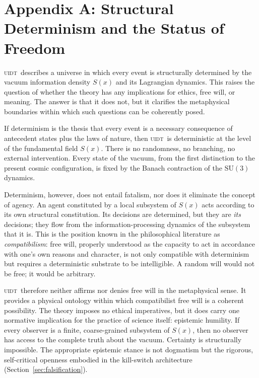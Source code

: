 \documentclass[12pt,a4paper,twoside]{article}
\theoremstyle{plain}
\theoremstyle{definition}
\theoremstyle{remark}
\newcommand{\UIDT}{\textsc{uidt}}
\newcommand{\Sx}{S(x)}
\begin{document}
\newpage

\section*{Appendix A: Structural Determinism and the Status of Freedom}
\label{app:normative}

\UIDT\ describes a universe in which every event is structurally determined by
the vacuum information density $\Sx$ and its Lagrangian dynamics. This raises
the question of whether the theory has any implications for ethics, free will,
or meaning. The answer is that it does not, but it clarifies the metaphysical
boundaries within which such questions can be coherently posed.

If determinism is the thesis that every event is a necessary consequence of
antecedent states plus the laws of nature, then \UIDT\ is deterministic at the
level of the fundamental field $\Sx$. There is no randomness, no branching,
no external intervention. Every state of the vacuum, from the first distinction
to the present cosmic configuration, is fixed by the Banach contraction of the
$\mathrm{SU}(3)$ dynamics.

Determinism, however, does not entail fatalism, nor does it eliminate the
concept of agency. An agent constituted by a local subsystem of $S(x)$ acts
according to its own structural constitution. Its decisions are determined,
but they are \emph{its} decisions; they flow from the information-processing
dynamics of the subsystem that it is. This is the position known in the
philosophical literature as \emph{compatibilism}: free will, properly understood
as the capacity to act in accordance with one's own reasons and character, is
not only compatible with determinism but requires a deterministic substrate
to be intelligible. A random will would not be free; it would be arbitrary.

\UIDT\ therefore neither affirms nor denies free will in the metaphysical
sense. It provides a physical ontology within which compatibilist free will is
a coherent possibility. The theory imposes no ethical imperatives, but it does
carry one normative implication for the practice of science itself: epistemic
humility. If every observer is a finite, coarse-grained subsystem of $S(x)$,
then no observer has access to the complete truth about the vacuum. Certainty
is structurally impossible. The appropriate epistemic stance is not dogmatism
but the rigorous, self-critical openness embodied in the kill-switch
architecture (Section~\ref{sec:falsification}).
\end{document}
